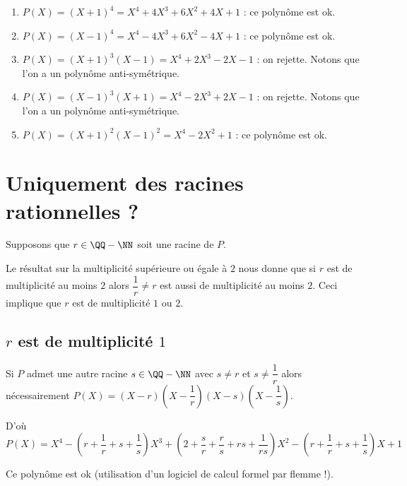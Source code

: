 \documentclass[12pt]{amsart}
\begin{document}
\begin{enumerate}
	\item $P(X) = (X + 1)^4 = X^4 + 4 X^3 + 6 X^2 + 4 X + 1$ : ce polynôme est ok.

	\item $P(X) = (X - 1)^4 = X^4 - 4 X^3 + 6 X^2 - 4 X + 1$ : ce polynôme est ok.
	
	\item $P(X) = (X + 1)^3 (X - 1) = X^4 + 2 X^3 - 2 X - 1$ : on rejette. Notons que l'on a un polynôme anti-symétrique.
	
	\item $P(X) = (X - 1)^3 (X + 1) = X^4 - 2 X^3 + 2 X - 1$ : on rejette. Notons que l'on a un polynôme anti-symétrique.

	\item $P(X) = (X + 1)^2 (X - 1)^2 = X^4 - 2 X^2 + 1$ : ce polynôme est ok.
\end{enumerate}


\section{Uniquement des racines rationnelles ?}

Supposons que $r \in \QQ - \NN$ soit une racine de $P$.

\medskip

Le résultat sur la multiplicité supérieure ou égale à $2$ nous donne que si $r$ est de multiplicité au moins $2$ alors $\dfrac1r \neq r$ est aussi de multiplicité au moins $2$.
Ceci implique que $r$ est de multiplicité $1$ ou $2$.



\subsection*{$r$ est de multiplicité $1$}

Si $P$ admet une autre racine $s \in \QQ - \NN$ avec $s \neq r$ et $s \neq \dfrac1r$ alors nécessairement $P(X) = (X - r) \left( X - \dfrac1r \right) (X - s) \left( X - \dfrac1s \right)$.


D'où
$P(X) = X^4
      - \left( r + \dfrac1r + s + \dfrac1s \right) X^3
      + \left( 2 + \dfrac{s}{r} + \dfrac{r}{s} + r s + \dfrac{1}{r s} \right) X^2
      - \left( r + \dfrac1r + s + \dfrac1s \right) X
      + 1$

Ce polynôme est ok (utilisation d'un logiciel de calcul formel par flemme !).


\bigskip
\end{document}
